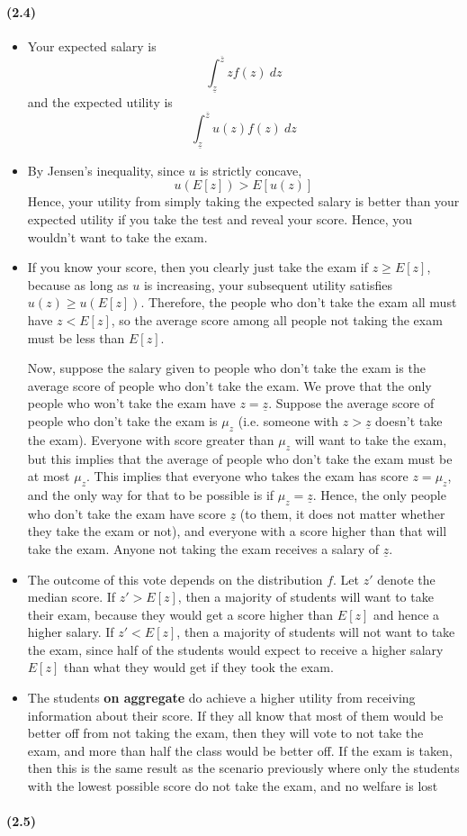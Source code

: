 \documentclass[10pt,letter]{article}
\begin{document}
\paragraph{(2.4)}
\begin{itemize}
\item Your expected salary is
\[ \int_{\underline{z}}^{\overline{z}} z f(z) \ dz \]
and the expected utility is
\[ \int_{\underline{z}}^{\overline{z}} u(z) f(z) \ dz \]
\item By Jensen's inequality, since $u$ is strictly concave,
\[ u(E[z]) > E[u(z)]  \]
Hence, your utility from simply taking the expected salary is better than your expected utility if you take the test and reveal your score. Hence, you wouldn't want to take the exam.
\item If you know your score, then you clearly just take the exam if $z \ge E[z]$, because as long as $u$ is increasing, your subsequent utility satisfies $u(z) \ge u(E[z])$. Therefore, the people who don't take the exam all must have $z < E[z]$, so the average score among all people not taking the exam must be less than $E[z]$.

Now, suppose the salary given to people who don't take the exam is the average score of people who don't take the exam. We prove that the only people who won't take the exam have $z = \underline{z}$. Suppose the average score of people who don't take the exam is $\mu_z$ (i.e. someone with $z > \underline{z}$ doesn't take the exam). Everyone with score greater than $\mu_z$ will want to take the exam, but this implies that the average of people who don't take the exam must be at most $\mu_z$. This implies that everyone who takes the exam has score $z = \mu_z$, and the only way for that to be possible is if $\mu_z = \underline{z}$. Hence, the only people who don't take the exam have score $\underline{z}$ (to them, it does not matter whether they take the exam or not), and everyone with a score higher than that will take the exam. Anyone not taking the exam receives a salary of $\underline{z}$.
\item The outcome of this vote depends on the distribution $f$. Let $z'$ denote the median score. If $z' > E[z]$, then a majority of students will want to take their exam, because they would get a score higher than $E[z]$ and hence a higher salary. If $z' < E[z]$, then a majority of students will not want to take the exam, since half of the students would expect to receive a higher salary $E[z]$ than what they would get if they took the exam.
\item The students \textbf{on aggregate} do achieve a higher utility from receiving information about their score. If they all know that most of them would be better off from not taking the exam, then they will vote to not take the exam, and more than half the class would be better off. If the exam is taken, then this is the same result as the scenario previously where only the students with the lowest possible score do not take the exam, and no welfare is lost
\end{itemize}
\paragraph{(2.5)}
\end{document}
